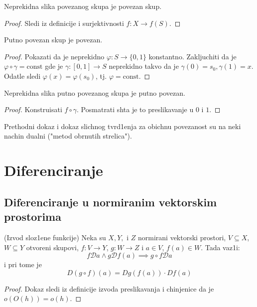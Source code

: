 \documentclass[a4paper,12pt]{article}
\newcommand{\psj}{\subseteq}
\newcommand{\const}{\mathrm{const}}
\begin{document}
\begin{tvr}
Neprekidna slika povezanog skupa je povezan skup.
\end{tvr}
\begin{proof}
Sledi iz definicije i surjektivnosti $f: X \to f(S)$.
\end{proof}

\begin{tvr}
Putno povezan skup je povezan.
\end{tvr}
\begin{proof}
Pokazati da je neprekidno $\varphi: S \to \{0,1\}$ konstantno. Zakljuchiti da je $\varphi \circ \gamma = \const$ gde je $\gamma:[0,1] \to S$ neprekidno takvo da je $\gamma(0) = s_0, \gamma(1) = x$. Odatle sledi $\varphi(x) = \varphi(s_0)$, tj. $\varphi = \const$.
\end{proof}

\begin{tvr}
Neprekidna slika putno povezanog skupa je putno povezan.
\end{tvr}
\begin{proof}
Konstruisati $f \circ \gamma$. Posmatrati shta je to preslikavanje u $0$ i $1$.
\end{proof}

\begin{nap}
Prethodni dokaz i dokaz slichnog tvrd1enja za obichnu povezanost su na neki nachin dualni ("metod obrnutih strelica").
\end{nap}

\section{Diferenciranje}
\subsection{Diferenciranje u normiranim vektorskim prostorima}

\begin{tma}(Izvod sloz1ene funkcije)
Neka su $X, Y,$ i $Z$ normirani vektorski prostori, $V \psj X$, $W \psj Y$ otvoreni skupovi, $f: V \to Y$, $g: W \to Z$ i $a \in V$, $f(a) \in W$. Tada vaz1i:
\[f\mathcal{D} a \wedge g \mathcal{D} f(a) \implies g\circ f \mathcal{D} a\]
i pri tome je
\[D(g \circ f) (a) = Dg(f(a))\cdot Df(a) \]
\end{tma}
\begin{proof}
Dokaz sledi iz definicije izvoda preslikavanja i chinjenice da je $o(O(h)) = o(h)$.
\end{proof}
\end{document}
